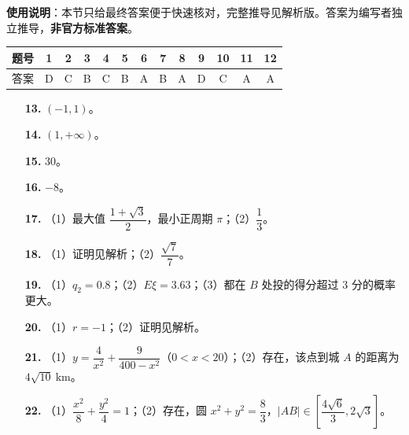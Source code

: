 
\begin{gknotice}
\textbf{使用说明}：本节只给最终答案便于快速核对，完整推导见解析版。答案为编写者独立推导，\textbf{非官方标准答案}。
\end{gknotice}

\begin{center}\begin{tabular}{ccccccccccccc}
\toprule
题号 & 1 & 2 & 3 & 4 & 5 & 6 & 7 & 8 & 9 & 10 & 11 & 12 \\
\midrule
答案 & D & C & B & C & B & A & B & A & D & C & A & A \\
\bottomrule
\end{tabular}\end{center}

\begin{itemize}[leftmargin=2.6em]
  \item[\textbf{13.}] $(-1,1)$。
  \item[\textbf{14.}] $(1,+\infty)$。
  \item[\textbf{15.}] $30$。
  \item[\textbf{16.}] $-8$。
\end{itemize}

\begin{itemize}[leftmargin=2.6em]
  \item[\textbf{17.}] （1）最大值 $\dfrac{1+\sqrt3}{2}$，最小正周期 $\pi$；（2）$\dfrac13$。
  \item[\textbf{18.}] （1）证明见解析；（2）$\dfrac{\sqrt7}{7}$。
  \item[\textbf{19.}] （1）$q_2=0.8$；（2）$E\xi=3.63$；（3）都在 $B$ 处投的得分超过 $3$ 分的概率更大。
  \item[\textbf{20.}] （1）$r=-1$；（2）证明见解析。
  \item[\textbf{21.}] （1）$y=\dfrac{4}{x^2}+\dfrac{9}{400-x^2}$（$0<x<20$）；（2）存在，该点到城 $A$ 的距离为 $4\sqrt{10}\ \mathrm{km}$。
  \item[\textbf{22.}] （1）$\dfrac{x^2}{8}+\dfrac{y^2}{4}=1$；（2）存在，圆 $x^2+y^2=\dfrac83$，$|AB|\in\left[\dfrac{4\sqrt6}{3},2\sqrt3\right]$。
\end{itemize}
